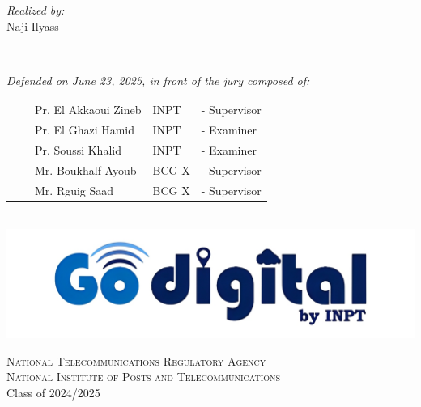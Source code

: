 \begin{titlepage}
\begin{center}
  \noindent
  \begin{minipage}{0.9\textwidth}
    \vspace{-7mm}
    \begin{flushleft} \large
      \emph{Realized by:}\\ \vspace{0.2cm}
      \hspace{0.95cm} Naji Ilyass  \\
    \end{flushleft}
  \end{minipage}
  \begin{minipage}{0.4\textwidth}
  \end{minipage}\\[1.6cm]

  \begin{minipage}{0.9\textwidth}
    \vspace{-7mm}
    \begin{flushleft} \large
      \emph{Defended on June 23, 2025, in front of the jury composed of:}\\ \vspace{0.3cm}
      \begin{tabular}{ll  l l l}
      &&Pr. El Akkaoui Zineb & INPT  & - Supervisor \\
      &&Pr. El Ghazi Hamid & INPT  & - Examiner \\
      &&Pr. Soussi Khalid & INPT  & - Examiner \\
      &&Mr. Boukhalf Ayoub & BCG X & - Supervisor \\
      &&Mr. Rguig Saad & BCG X & - Supervisor \\
      \end{tabular}
    \end{flushleft}
  \end{minipage}\\[0.7cm]


  \includegraphics[scale=0.3]{Images/go digital.jpg}
  
  \vspace{0.3cm}
  \textsc{National Telecommunications Regulatory Agency}\\
  \textsc{National Institute of Posts and Telecommunications}\\
  \vspace{0.7cm}
  {\large Class of 2024/2025}
  
  \end{center}
  \end{titlepage}
  